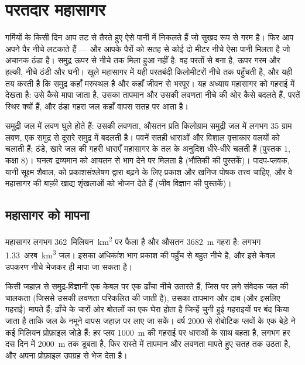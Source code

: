 \chapter{परतदार महासागर}\label{ch:g10:layered-ocean}

गर्मियों के किसी दिन आप तट से तैरते हुए ऐसे पानी में निकलते हैं जो सुखद रूप से गरम है।
फिर आप अपने पैर नीचे लटकाते हैं --- और आपके पैरों को सतह से कोई दो मीटर नीचे ऐसा पानी
मिलता है जो अचानक ठंडा है। समुद्र ऊपर से नीचे तक मिला हुआ नहीं है:
वह परतों से बना है, ऊपर गरम और हल्की, नीचे ठंडी और
घनी। खुले महासागर में यही परतबंदी किलोमीटरों नीचे तक पहुँचती है,
और यही तय करती है कि समुद्र कहाँ मरुस्थल है और कहाँ जीवन से भरपूर। यह
अध्याय महासागर को गहराई में देखता है: उसे कैसे मापा जाता है, उसका तापमान
और उसकी लवणता नीचे की ओर कैसे बदलते हैं, परतें स्थिर क्यों हैं, और ठंडा गहरा जल
कहाँ वापस सतह पर आता है।

\begin{recall}
समुद्री जल में लवण घुले होते हैं: उसकी लवणता, औसतन प्रति किलोग्राम समुद्री जल में लगभग
35 ग्राम लवण, एक समुद्र से दूसरे समुद्र में बदलती है। पवनें
सतही धाराओं और विशाल वृत्ताकार वलयों को चलाती हैं; ठंडे, खारे
जल की गहरी धाराएँ महासागर के तल के अनुदिश धीरे-धीरे चलती हैं (पुस्तक 1, कक्षा 8)। घनत्व द्रव्यमान को
आयतन से भाग देने पर मिलता है (भौतिकी की पुस्तकें)। पादप-प्लवक, यानी सूक्ष्म शैवाल,
को प्रकाशसंश्लेषण द्वारा बढ़ने के लिए प्रकाश और खनिज पोषक तत्त्व चाहिए, और वे
महासागर की बाक़ी खाद्य शृंखलाओं को भोजन देते हैं (जीव विज्ञान की पुस्तकें)।
\end{recall}

\section{महासागर को मापना}

महासागर लगभग \num{362}~मिलियन~\unit{km^2} पर फैला है और औसतन
\qty{3682}{m} गहरा है: लगभग \num{1.33}~अरब~\unit{km^3} जल। इसका अधिकांश भाग
प्रकाश की पहुँच से बहुत नीचे है, और इसे केवल उपकरण नीचे भेजकर ही मापा
जा सकता है।

किसी जहाज़ से समुद्र-विज्ञानी एक केबल पर एक ढाँचा नीचे उतारते हैं, जिस पर लगे संवेदक
जल की चालकता (जिससे उसकी लवणता परिकलित की जाती है), उसका तापमान
और दाब (और इसलिए गहराई) मापते हैं; ढाँचे के चारों ओर बोतलों का एक घेरा होता है
जिन्हें चुनी हुई गहराइयों पर बंद किया जाता है ताकि जल के नमूने वापस जहाज़ पर लाए जा सकें।
वर्ष 2000 से रोबोटिक प्लवों के एक बेड़े ने कई मिलियन
प्रोफ़ाइल जोड़े हैं: हर प्लव \qty{1000}{m} की गहराई पर धाराओं के साथ बहता है,
लगभग हर दस दिन में \qty{2000}{m} तक डूबता है, फिर रास्ते में तापमान और लवणता
मापते हुए सतह तक उठता है, और अपना प्रोफ़ाइल
उपग्रह से भेज देता है।

